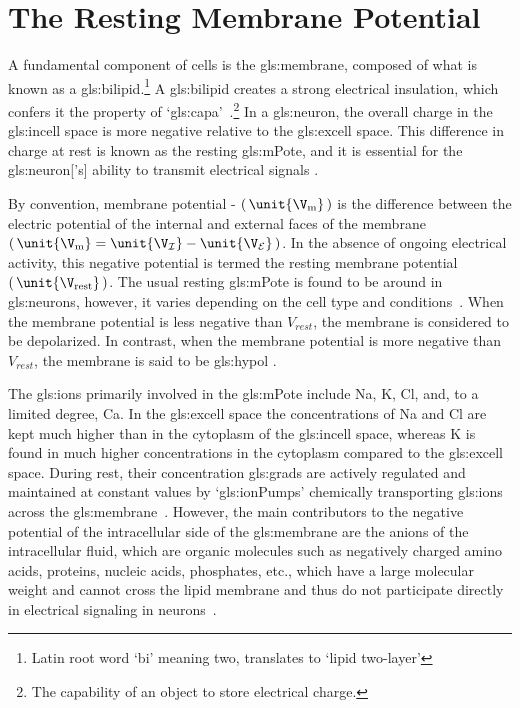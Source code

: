 \documentclass[class={myRUCProject}, crop=false]{standalone}
\begin{document}
\section{The Resting Membrane Potential} 
A fundamental component of cells is the \gls{gls:membrane}, composed of what is known as a \gls{gls:bilipid}.{}\footnote{Latin root word `bi' meaning two, translates to `lipid two-layer'} 
A \gls{gls:bilipid} creates a strong electrical insulation, which confers it the property of `\gls{gls:capa}'~\cite{Hammond2015ch3,Hammond2015ch4}.{}\footnote{The capability of an object to store electrical charge.}
In a \gls{gls:neuron}, the overall charge in the \gls{gls:incell} space is more negative relative to the \gls{gls:excell} space. This difference in charge at rest is known as the resting \gls{gls:mPote}, and it is essential for the \gls{gls:neuron}['s] ability to transmit electrical signals \cite{Hammond2015ch3,Hammond2015ch4}. 

By convention, membrane potential - \(\br{\unit{\V\membrane}}\) is the difference between the electric potential of the internal and external faces of the membrane \(\br{\unit{\V\membrane}=\unit{\V\incell}-\unit{\V\excell}}\). In the absence of ongoing electrical activity, this negative potential is termed the resting membrane potential \(\br{\unit{\V\rest}}\). The usual resting \gls{gls:mPote} is found to be around  in \glspl{gls:neuron}, however, it varies depending on the cell type and conditions~\cite{Hammond2015ch3,Hammond2015ch4}. When the membrane potential is less negative than \(V_{rest}\), the membrane is considered to be depolarized. In contrast, when the membrane potential is more negative than \(V_{rest}\), the membrane is said to be \gls{gls:hypol} \cite{Hammond2015ch3}. 

The \glspl{gls:ion} primarily involved in the \gls{gls:mPote} include \gls{Na}, \gls{K}, \gls{Cl}, and, to a limited degree, \gls{Ca}. 
In the \gls{gls:excell} space the concentrations of \gls{Na} and \gls{Cl} are kept much higher than in the cytoplasm of the \gls{gls:incell} space, whereas \gls{K} is found in much higher concentrations in the cytoplasm compared to the \gls{gls:excell} space. 
During rest, their concentration \glspl{gls:grad} are actively regulated and maintained at constant values by `\glspl{gls:ionPump}' chemically transporting \glspl{gls:ion} across the \gls{gls:membrane}~\cite{Hammond2015ch3,Hammond2015ch4}. 
However, the main contributors to the negative potential of the intracellular side of the \gls{gls:membrane} are the anions of the intracellular fluid, which are organic molecules such as negatively charged amino acids, proteins, nucleic acids, phosphates, etc., which have a large molecular weight and cannot cross the lipid membrane and thus do not participate directly in electrical signaling in neurons~\cite{Hammond2015ch3}. 
\end{document}
